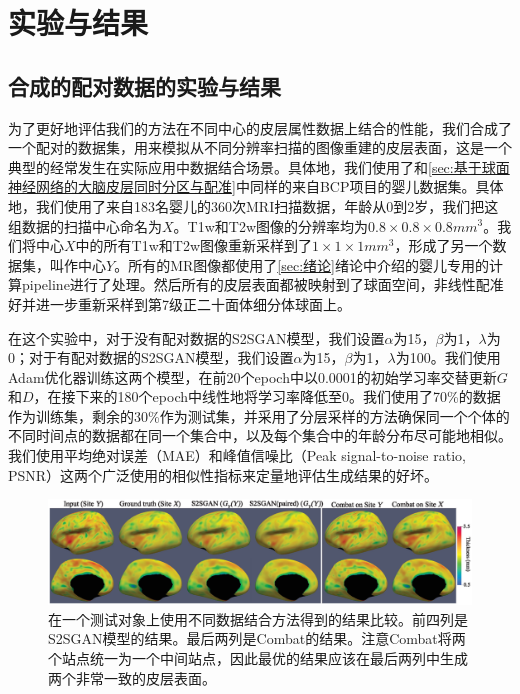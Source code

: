 	

\section{实验与结果}

\subsection{合成的配对数据的实验与结果}\label{sec:Synthetic}
为了更好地评估我们的方法在不同中心的皮层属性数据上结合的性能，我们合成了一个配对的数据集，用来模拟从不同分辨率扫描的图像重建的皮层表面，这是一个典型的经常发生在实际应用中数据结合场景。具体地，我们使用了和\ref{sec:基于球面神经网络的大脑皮层同时分区与配准}中同样的来自BCP项目\cite{howell2019unc}的婴儿数据集。具体地，我们使用了来自183名婴儿的360次MRI扫描数据，年龄从0到2岁，我们把这组数据的扫描中心命名为$X$。T1w和T2w图像的分辨率均为$0.8\times 0.8\times 0.8mm^3$。我们将中心$X$中的所有T1w和T2w图像重新采样到了$1\times 1\times 1mm^3$，形成了另一个数据集，叫作中心$Y$。所有的MR图像都使用了\ref{sec:绪论}绪论中介绍的婴儿专用的计算pipeline进行了处理。然后所有的皮层表面都被映射到了球面空间，非线性配准好并进一步重新采样到第7级正二十面体细分体球面上。

在这个实验中，对于没有配对数据的S2SGAN模型，我们设置$\alpha$为15，$\beta$为1，$\lambda$为0；对于有配对数据的S2SGAN模型，我们设置$\alpha$为15，$\beta$为1，$\lambda$为100。我们使用Adam优化器训练这两个模型，在前20个epoch中以0.0001的初始学习率交替更新$G$和$D$，在接下来的180个epoch中线性地将学习率降低至0。我们使用了70\%的数据作为训练集，剩余的30\%作为测试集，并采用了分层采样的方法确保同一个个体的不同时间点的数据都在同一个集合中，以及每个集合中的年龄分布尽可能地相似。我们使用平均绝对误差（MAE）和峰值信噪比（Peak signal-to-noise ratio, PSNR）这两个广泛使用的相似性指标来定量地评估生成结果的好坏。

\begin{figure}[h]
	\centering
	\includegraphics[width=\linewidth]{figure/s2sgan_paired_result.eps}
	\caption{在一个测试对象上使用不同数据结合方法得到的结果比较。前四列是S2SGAN模型的结果。最后两列是Combat的结果。注意Combat将两个站点统一为一个中间站点，因此最优的结果应该在最后两列中生成两个非常一致的皮层表面。}\label{fig:s2sgan_paired_result} 
\end{figure} 

